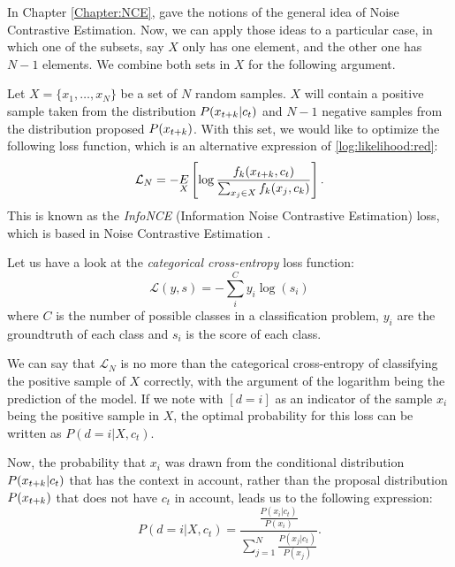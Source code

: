 In Chapter \ref{Chapter:NCE}, gave the notions of the general idea of Noise Contrastive Estimation. Now, we can apply those ideas to a particular case, in which one of the subsets, say $X$ only has one element, and the other one has $N-1$ elements. We combine both sets in $X$ for the following argument.

Let $X = \{x_1,\dots,x_N\}$ be a set of $N$ random samples. $X$ will contain a positive sample taken from the distribution $P( x_{t+k} |c_t)$ and $N-1$ negative
samples from the distribution proposed $P(x_{t+k})$. With this set, we would like to optimize the following loss function, which is an alternative expression of \ref{log:likelihood:red}:
\begin{equation}\label{NCE:loss}
\mathcal L_N = - \underset{X}{E} \left[\log \frac{f_k(x_{t+k},c_t)}{\sum_{x_j \in X} f_k(x_j,c_k)}\right].
\end{equation}
This is known as the \emph{InfoNCE} (Information Noise Contrastive Estimation) loss, which is based in Noise Contrastive Estimation \citep{gutmann_noise-contrastive_nodate}.

Let us have a look at the \emph{categorical cross-entropy} loss function:
\[
    \mathcal L(y,s) = -\sum_i^C y_i \log(s_i)    
\]
where $C$ is the number of possible classes in a classification problem, $y_i$ are the groundtruth of each class and $s_i$ is the score of each class.

We can say that $\mathcal L_N$ is no more than the categorical cross-entropy of classifying the positive sample of $X$ correctly, with the argument of the logarithm being the prediction
of the model. If we note with $[d = i]$ as an indicator of the sample $x_i$ being the positive sample in $X$, the optimal probability for this loss can be written as $P(d = i|X,c_t)$. 

Now, the probability that $x_i$ was drawn from the conditional distribution $P(x_{t+k}|c_t)$ that has the context in account, rather than the proposal distribution $P(x_{t+k})$ that does not have $c_t$ in account, leads us to the following expression:
$$
P(d = i | X , c_t) = \frac{ \frac{P(x_i|c_t)}{P(x_i)}}{\sum_{j=1}^N \frac{P(x_j|c_t)}{P(x_j)}}.
$$

